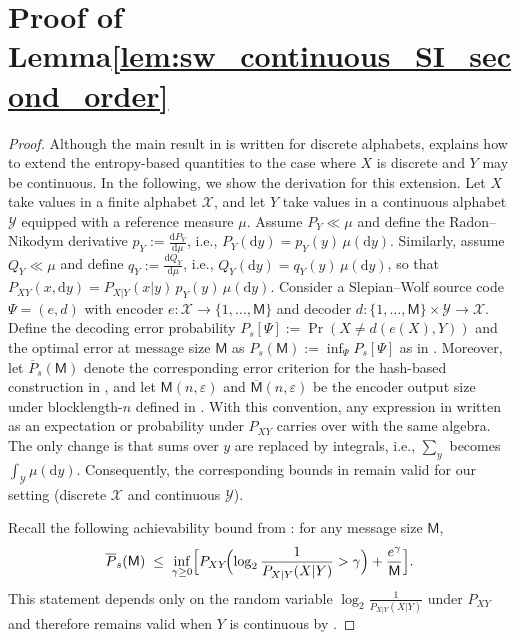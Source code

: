 \documentclass[onecolumn]{IEEEtran} %
\newcommand{\1}{\mathbbm{1}}
\theoremstyle{boldremark}
\begin{document}
\section{Proof of Lemma\ref{lem:sw_continuous_SI_second_order}}\label{APP_proof_sw_continuous_SI_second_order}
\begin{proof}
Although the main result in \cite{Hayashi_SWC_Entropy20} is written for discrete alphabets, \cite[Remark~1]{Hayashi_SWC_Entropy20} explains how to extend the entropy-based quantities to the case where $X$ is discrete and $Y$ may be continuous. In the following, we show the derivation for this extension. Let $X$ take values in a finite alphabet $\mathcal{X}$, and let $Y$ take values in a continuous alphabet $\mathcal{Y}$ equipped with a reference measure $\mu$. Assume $P_Y\ll \mu$ and define the Radon--Nikodym derivative $p_Y:=\frac{\mathrm{d}P_Y}{\mathrm{d}\mu}$, i.e., $P_Y(\mathrm{d}y)=p_Y(y)\,\mu(\mathrm{d}y)$. Similarly, assume $Q_Y\ll \mu$ and define $q_Y:=\frac{\mathrm{d}Q_Y}{\mathrm{d}\mu}$, i.e., $Q_Y(\mathrm{d}y)=q_Y(y)\,\mu(\mathrm{d}y)$, so that
$P_{XY}(x,\mathrm{d}y)=P_{X|Y}(x|y)\,p_Y(y)\,\mu(\mathrm{d}y)$.
Consider a Slepian--Wolf source code $\Psi=(e,d)$ with encoder
$e:\mathcal{X}\to\{1,\dots,\textsf{M}\}$ and decoder
$d:\{1,\dots,\textsf{M}\}\times\mathcal{Y}\to\mathcal{X}$.
Define the decoding error probability
$P_s[\Psi] := \Pr( X \neq d(e(X),Y))$ and the optimal error at message size $\textsf{M}$ as
$P_s(\textsf{M}) := \inf_{\Psi} P_s[\Psi]$ as in \cite[(109)--(112)]{Hayashi_SWC_Entropy20}.
Moreover, let $\overline{P}_s(\textsf{M})$ denote the corresponding error criterion for the hash-based construction in \cite[(113)--(114)]{Hayashi_SWC_Entropy20}, and let $\textsf{M}(n,\varepsilon)$ and
$\overline{\textsf{M}}(n,\varepsilon)$ be the encoder output size under blocklength-$n$ defined in
\cite[Eqs.~(109)--(116)]{Hayashi_SWC_Entropy20}. With this convention, any expression in \cite[Sec.~3.2]{Hayashi_SWC_Entropy20} written as an expectation or
probability under $P_{XY}$ carries over with the same algebra. The only change is that sums over $y$ are
replaced by integrals, i.e., $\sum_{y}$ becomes $\int_{\mathcal{Y}} \mu(\mathrm{d}y)$.
Consequently, the corresponding bounds in \cite[Sec.~3.2]{Hayashi_SWC_Entropy20} remain valid for our setting
(discrete $\mathcal{X}$ and continuous $\mathcal{Y}$).

Recall the following achievability bound from \cite[Lemma~13]{Hayashi_SWC_Entropy20}:
for any message size $\textsf{M}$,
\begin{align}
  \overline{P}_s(\textsf{M})
  \;\le\;
  \inf_{\gamma\ge 0}\Bigl[
    P_{XY}\!\Bigl(\log_2\frac{1}{P_{X|Y}(X|Y)} > \gamma\Bigr)
    + \frac{e^\gamma}{\textsf{M}}
  \Bigr].
  \label{eq:HW_L13}
\end{align}
This statement depends only on the random variable $\log_2 \frac{1}{P_{X|Y}(X|Y)}$ under $P_{XY}$ and
therefore remains valid when $Y$ is continuous by \cite[Remark~1]{Hayashi_SWC_Entropy20}.


\end{proof}
\end{document}
